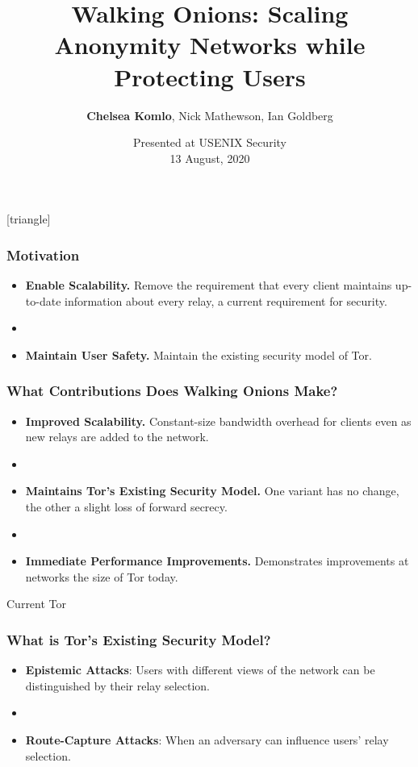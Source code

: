 \documentclass[hyperref={pdfpagelabels=true},table,dvipsnames,14pt,aspectratio=169]{beamer}
\title[Walking Onions]{Walking Onions: Scaling Anonymity Networks while Protecting Users}
\author{\textbf{Chelsea Komlo}, Nick Mathewson, Ian Goldberg}
\date{Presented at USENIX Security \\ 13 August, 2020}
\begin{document}
[triangle]

\begin{frame}
        \thispagestyle{empty}
        \maketitle
\end{frame}


\begin{frame}
\frametitle{Motivation}
  \begin{itemize}
    \item<1-> \textbf{Enable Scalability.} Remove the requirement that every
      client maintains up-to-date information about every relay, a current
      requirement for security.
    \item<1>[]~
    \item<2> \textbf{Maintain User Safety.} Maintain the existing security model of Tor.
  \end{itemize}
\end{frame}

\begin{frame}
\frametitle{What Contributions Does Walking Onions Make?}
  \begin{itemize}
    \item<1-> \textbf{Improved Scalability.} Constant-size bandwidth overhead for
      clients even as new relays are added to the network.
    \item<1->[]~
    \item<2-> \textbf{Maintains Tor's Existing Security Model.} One variant has no change,
      the other a slight loss of forward secrecy.
    \item<2->[]~
    \item<3-> \textbf{Immediate Performance Improvements.} Demonstrates
      improvements at networks the size of Tor today.
  \end{itemize}
\end{frame}

\begin{frame}
  \centering
  \huge
  Current Tor
\end{frame}

\begin{frame}
\frametitle{What is Tor's Existing Security Model?}

  \begin{itemize}
    \item<1-> \textbf{Epistemic Attacks}: Users with different views of the
      network can be distinguished by their relay selection.
    \item<1->[]~
    \item<2-> \textbf{Route-Capture Attacks}: When an adversary can influence
      users' relay selection.
  \end{itemize}

\end{frame}
\end{document}
